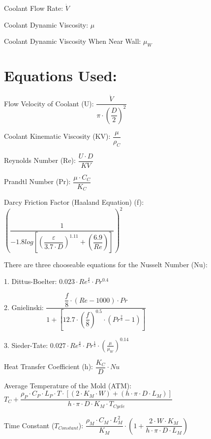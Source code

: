 \documentclass[a4paper,12pt]{article}
\begin{document}
Coolant Flow Rate: $\dot{V}$

Coolant Dynamic Viscosity: $\mu$

Coolant Dynamic Viscosity When Near Wall: $\mu_{W}$

\clearpage

\section*{Equations Used:}

\medskip

Flow Velocity of Coolant (U): $\dfrac{\dot{V}}{\pi \cdot (\dfrac{D}{2})^{2}}$

\medskip

Coolant Kinematic Viscosity (KV): $\dfrac{\mu}{\rho_{C}}$

\medskip

Reynolds Number (Re): $\dfrac{U \cdot D}{KV}$

\medskip

Prandtl Number (Pr): $\dfrac{\mu \cdot C_{C}}{K_{C}}$

\medskip

Darcy Friction Factor (Haaland Equation) (f): $(\dfrac{1}{-1.8log[(\dfrac{\varepsilon}{3.7 \cdot D})^{1.11}+(\dfrac{6.9}{Re})]})^{2}$

\medskip

There are three chooseable equations for the Nusselt Number (Nu):

1. Dittus-Boelter: $0.023 \cdot Re^{\frac{4}{5}} \cdot Pr^{0.4}$

\medskip

2. Gnielinski: $\dfrac{\dfrac{f}{8} \cdot (Re-1000) \cdot Pr}{1 + [12.7 \cdot (\dfrac{f}{8})^{0.5} \cdot (Pr^{\frac{2}{3}}-1)]}$

\medskip

3. Sieder-Tate: $0.027 \cdot Re^{\frac{4}{5}} \cdot Pr^{\frac{1}{3}} \cdot (\frac{\mu}{\mu_{W}})^{0.14}$

\medskip

Heat Transfer Coefficient (h): $\dfrac{K_{C}}{D} \cdot Nu$

\medskip

Average Temperature of the Mold (ATM): $T_{C} + \dfrac{\rho_{P} \cdot C_{P} \cdot L_{P} \cdot T \cdot [(2 \cdot K_{M} \cdot W) + (h \cdot \pi \cdot D \cdot L_{M})]}{h \cdot \pi \cdot D \cdot K_{M} \cdot T_{Cycle}}$ 

\medskip

Time Constant ($T_{Constant}$): $\dfrac{\rho_{M} \cdot C_{M} \cdot L_{M}^{2}}{K_{M}} \cdot (1 + \dfrac{2 \cdot W \cdot K_{M}}{h \cdot \pi \cdot D \cdot L_{M}})$
\end{document}
